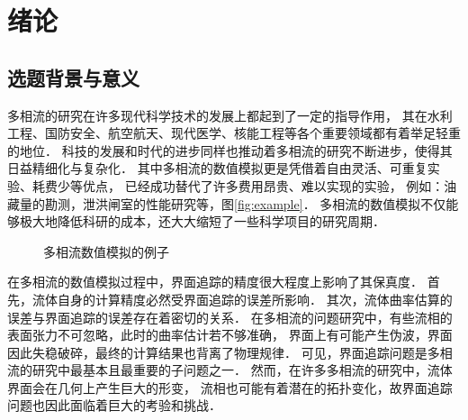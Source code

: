 
\chapter{绪论}
\label{chap_int}
\section{选题背景与意义}
多相流的研究在许多现代科学技术的发展上都起到了一定的指导作用，
其在水利工程、国防安全、航空航天、现代医学、核能工程等各个重要领域都有着举足轻重的地位．
科技的发展和时代的进步同样也推动着多相流的研究不断进步，使得其日益精细化与复杂化．
其中多相流的数值模拟更是凭借着自由灵活、可重复实验、耗费少等优点，
已经成功替代了许多费用昂贵、难以实现的实验，
例如：油藏量的勘测，泄洪闸室的性能研究等，图\eqref{fig:example}．
多相流的数值模拟不仅能够极大地降低科研的成本，还大大缩短了一些科学项目的研究周期．

 \begin{figure}[htbp]
 	\label{fig:example}
	\centering
	\hfill
\caption[多相流数值模拟的例子]{多相流数值模拟的例子}
\end{figure}

在多相流的数值模拟过程中，界面追踪的精度很大程度上影响了其保真度．
首先，流体自身的计算精度必然受界面追踪的误差所影响．
其次，流体曲率估算的误差与界面追踪的误差存在着密切的关系\cite{zhang17:_hfes}．
在多相流的问题研究中，有些流相的表面张力不可忽略，此时的曲率估计若不够准确，
界面上有可能产生伪波，界面因此失稳破碎，最终的计算结果也背离了物理规律\cite{denner14:comparative,francois06:balanced_force,lafaurie94:modeling}．
可见，界面追踪问题是多相流的研究中最基本且最重要的子问题之一．
然而，在许多多相流的研究中，流体界面会在几何上产生巨大的形变，
流相也可能有着潜在的拓扑变化，故界面追踪问题也因此面临着巨大的考验和挑战．




